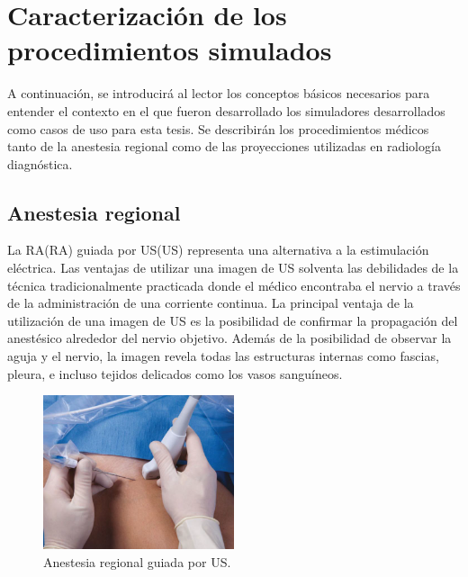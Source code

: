 \section{Caracterización de los procedimientos simulados}

A continuación, se introducirá al lector los conceptos básicos necesarios para entender el contexto en el que fueron desarrollado los simuladores desarrollados como casos de uso para esta tesis. Se describirán los procedimientos médicos tanto de la anestesia regional como de las proyecciones utilizadas en radiología diagnóstica.

\subsection{Anestesia regional}
\label{art:ra}




La \acl{RA}(\acs{RA}) guiada por \acl{US}(\acs{US}) representa una alternativa a la estimulación eléctrica. Las ventajas de utilizar una imagen de \ac{US} solventa las debilidades de la técnica tradicionalmente practicada donde el médico encontraba el nervio a través de la administración de una corriente continua. La principal ventaja de la utilización de una imagen de \ac{US} es la posibilidad de confirmar la propagación del anestésico alrededor del nervio objetivo. Además de la posibilidad de observar la aguja y el nervio, la imagen revela todas las estructuras internas como fascias, pleura, e incluso tejidos delicados como los vasos sanguíneos. 

\begin{figure}[h]
   \centering
    \includegraphics[width=0.5\textwidth]{IMG/RAUS.png}
    \caption{ Anestesia regional guiada por \acl{US}.}
   \label{fig:raus}
\end{figure}

